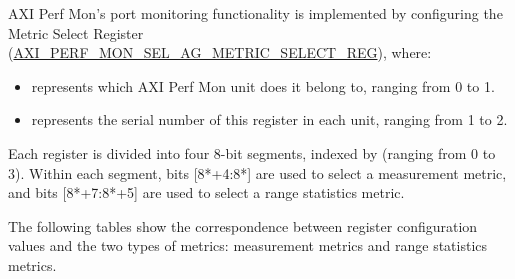\documentclass[main\_\_EN.tex]{subfiles}
\begin{document}
AXI Perf Mon's port monitoring functionality is implemented by configuring the Metric Select Register (\hyperref[regdesc:AXIPERFMONSELAGNMETRICSELECTMREG]{AXI\_PERF\_MON\_SEL\_AG\_METRIC\_SELECT\_REG}), where:
\begin{itemize}
    \item {} represents which AXI Perf Mon unit does it belong to, ranging from 0 to 1.
    \item {} represents the serial number of this register in each unit, ranging from 1 to 2.
\end{itemize}

Each register is divided into four 8-bit segments, indexed by  (ranging from 0 to 3). Within each segment, bits [8*+4:8*] are used to select a measurement metric, and bits [8*+7:8*+5] are used to select a range statistics metric. 

The following tables show the correspondence between register configuration values and the two types of metrics: measurement metrics and range statistics metrics.
\end{document}

